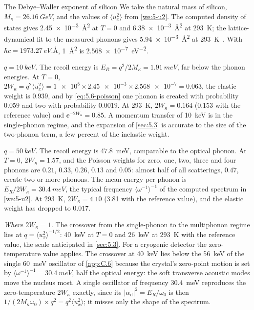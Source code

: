 \begin{workedexample}{The Debye--Waller exponent of silicon}\label{we:5-dw}
We take the natural mass of silicon, $M_\kappa = \SI{26.16}{GeV}$, and the values of $\langle u_x^2\rangle$ from \cref{we:5-u2}. The computed density of states gives \SI{2.45e-3}{\angstrom^2} at $T = 0$ and \SI{6.38e-3}{\angstrom^2} at \SI{293}{K}; the lattice-dynamical fit to the measured phonons gives \SI{5.94e-3}{\angstrom^2} at \SI{293}{K}~\cite{flensburg1999lattice}. With $\hbar c = \SI{1973.27}{eV.\angstrom}$, \SI{1}{\angstrom^2} is \SI{2.568e-7}{eV^{-2}}.

\emph{$q = \SI{10}{keV}$.} The recoil energy is $E_R = q^2/2M_\kappa = \SI{1.91}{meV}$, far below the phonon energies. At $T = 0$, $2W_\kappa = q^2\langle u_x^2\rangle = \num{1e8}\times\num{2.45e-3}\times\num{2.568e-7} = 0.063$, the elastic weight is $0.939$, and by \cref{eq:5.6-poisson} one phonon is created with probability $0.059$ and two with probability $0.0019$. At \SI{293}{K}, $2W_\kappa = 0.164$ (0.153 with the reference value) and $\ee^{-2W_\kappa} = 0.85$. A momentum transfer of \SI{10}{keV} is in the single-phonon regime, and the expansion of \cref{sec:5.3} is accurate to the size of the two-phonon term, a few percent of the inelastic weight.

\emph{$q = \SI{50}{keV}$.} The recoil energy is \SI{47.8}{meV}, comparable to the optical phonon. At $T = 0$, $2W_\kappa = 1.57$, and the Poisson weights for zero, one, two, three and four phonons are $0.21$, $0.33$, $0.26$, $0.13$ and $0.05$: almost half of all scatterings, $0.47$, create two or more phonons. The mean energy per phonon is $E_R/2W_\kappa = \SI{30.4}{meV}$, the typical frequency $\langle\omega^{-1}\rangle^{-1}$ of the computed spectrum in \cref{we:5-u2}. At \SI{293}{K}, $2W_\kappa = 4.10$ (3.81 with the reference value), and the elastic weight has dropped to $0.017$.

\emph{Where $2W_\kappa = 1$.} The crossover from the single-phonon to the multiphonon regime lies at $q = \langle u_x^2\rangle^{-1/2}$: \SI{40}{keV} at $T = 0$ and \SI{26}{keV} at \SI{293}{K} with the reference value, the scale anticipated in \cref{sec:5.3}. For a cryogenic detector the zero-temperature value applies. The crossover at \SI{40}{keV} lies below the \SI{56}{keV} of the single \SI{60}{meV} oscillator of \cref{app:C.6} because the crystal's zero-point motion is set by $\langle\omega^{-1}\rangle^{-1} = \SI{30.4}{meV}$, half the optical energy: the soft transverse acoustic modes move the nucleus most. A single oscillator of frequency \SI{30.4}{meV} reproduces the zero-temperature $2W_\kappa$ exactly, since its $|\alpha_{\mathrm{d}}|^2 = E_R/\omega_0$ is then $1/(2M_\kappa\omega_0)\times q^2 = q^2\langle u_x^2\rangle$; it misses only the shape of the spectrum.


\end{workedexample}

